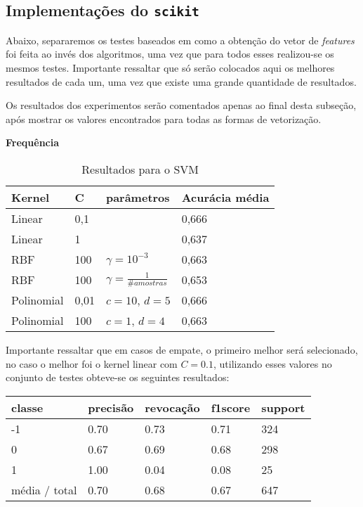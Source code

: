 \subsection{Implementações do \texttt{scikit}}

Abaixo, separaremos os testes baseados em como a obtenção do vetor de \textit{features} foi feita
ao invés dos algoritmos, uma vez que para todos esses realizou-se os mesmos testes. Importante 
ressaltar que só serão colocados aqui os melhores resultados de cada um, uma vez que existe uma
grande quantidade de resultados. 

Os resultados dos experimentos serão comentados apenas ao final desta subseção, após mostrar
os valores encontrados para todas as formas de vetorização.


\textbf{Frequência}

\begin{table}[H]
	\centering
	\caption{Resultados para o SVM}
	\begin{tabular}{l l l l}
		\hline
		Kernel & C & parâmetros & Acurácia média \\
		\hline
		Linear & 0,1 & & 0,666 \\
		\hline
		Linear & 1 & & 0,637 \\
		\hline
		RBF & 100 & $\gamma = 10^{-3}$ & 0,663 \\
		\hline
		RBF & 100 & $\gamma = \frac{1}{\# amostras}$ & 0,653 \\
		\hline
		Polinomial & 0,01 & $c = 10$, $d = 5$ & 0,666 \\
		\hline
		Polinomial & 100 & $c = 1$, $d = 4$ & 0,663 \\
		\hline
	\end{tabular}
\end{table}

Importante ressaltar que em casos de empate, o primeiro melhor será selecionado, no caso o melhor
foi o kernel linear com $C = 0.1$, utilizando esses valores no conjunto de testes obteve-se os 
seguintes resultados:

\begin{table}[H]
	\centering
		\begin{tabular}{l | l | l | l | l}
		\hline
		classe  	&	precisão  &  revocação &  f1\-score &  support \\
		\hline		
		 -1     &  0.70  &    0.73   &   0.71   &    324 \\
		  \hline
          0     &  0.67   &   0.69   &   0.68    &   298 \\
          \hline
          1     &  1.00   &   0.04   &   0.08    &    25 \\
			\hline
		média / total     &  0.70  &    0.68  &    0.67   &    647 \\
		\hline
	\end{tabular}
\end{table}

